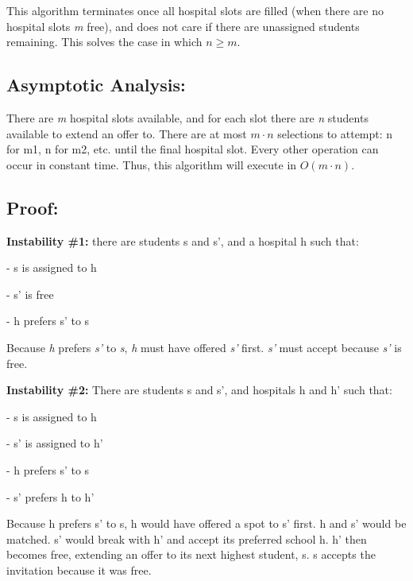 \documentclass{article}
\newcommand{\tab}[1][1]{\noindent \hspace{#1cm} }
\begin{document}
\noindent This algorithm terminates once all hospital slots are filled (when there are no hospital slots \textit{m} free), and does not care if there are unassigned students remaining.  This solves the case in which $ n \geq m$.

\subsection*{Asymptotic Analysis:}
There are \textit{m} hospital slots available, and for each slot there are \textit{n} students available to extend an offer to.  There are at most $m \cdot n$ selections to attempt:  n for m1, n for m2, etc. until the final hospital slot.  Every other operation can occur in constant time.  Thus, this algorithm will execute in $O(m \cdot n)$.

\subsection*{Proof:}
\textbf{Instability \#1:}  there are students s and s', and a hospital h such that:

	\tab - s is assigned to h 
	
	\tab - s' is free
	
	\tab - h prefers s' to s

\noindent Because \textit{h} prefers \textit{s'} to \textit{s}, \textit{h} must have offered \textit{s'} first.  \textit{s'} must accept because \textit{s'} is free.

\noindent \textbf{Instability \#2:}  There are students s and s', and hospitals h and h' such that:

	\tab - s is assigned to h 
	
	\tab - s' is assigned to h' 
	
	\tab - h prefers s' to s
	
	\tab - s' prefers h to h'
	
\begin{algorithm}
\begin{algorithmic}
	\State Because h prefers s' to s, h would have offered a spot to s' first.
		\State h and s' would be matched.
	\EndIf
		\State s' would break with h' and accept its preferred school h.
		\State h' then becomes free, extending an offer to its next highest student, s.
		\State s accepts the invitation because it was free.
	\EndIf
\end{algorithmic}
\end{algorithm}
\end{document}
